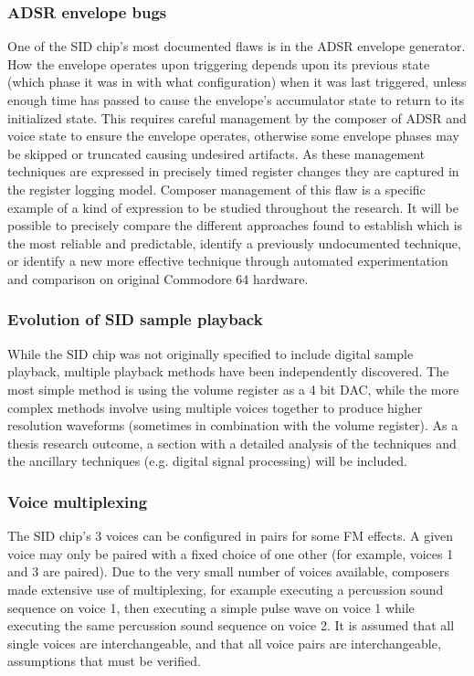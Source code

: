 \documentclass[10pt]{article}
\begin{document}
\begin{multicols*}{2}
\subsubsection{ADSR envelope bugs}

One of the SID chip’s most documented flaws is in the ADSR envelope generator. How the envelope operates upon triggering depends upon its previous state (which phase it was in with what configuration) when it was last triggered, unless enough time has passed to cause the envelope’s accumulator state to return to its initialized state. This requires careful management by the composer of ADSR and voice state to ensure the envelope operates, otherwise some envelope phases may be skipped or truncated causing undesired artifacts. As these management techniques are expressed in precisely timed register changes they are captured in the register logging model. Composer management of this flaw is a specific example of a kind of expression to be studied throughout the research. It will be possible to precisely compare the different approaches found to establish which is the most reliable and predictable, identify a previously undocumented technique, or identify a new more effective technique through automated experimentation and comparison on original Commodore 64 hardware.

\subsubsection{Evolution of SID sample playback}

While the SID chip was not originally specified to include digital sample playback, multiple playback methods have been independently discovered. The most simple method is using the volume register as a 4 bit DAC, while the more complex methods involve using multiple voices together to produce higher resolution waveforms (sometimes in combination with the volume register). As a thesis research outcome, a section with a detailed analysis of the techniques and the ancillary techniques (e.g. digital signal processing) will be included.

\subsubsection{Voice multiplexing}

The SID chip's 3 voices can be configured in pairs for some FM effects. A given voice may only be paired with a fixed choice of one other (for example, voices 1 and 3 are paired). Due to the very small number of voices available, composers made extensive use of multiplexing, for example executing a percussion sound sequence on voice 1, then executing a simple pulse wave on voice 1 while executing the same percussion sound sequence on voice 2. It is assumed that all single voices are interchangeable, and that all voice pairs are interchangeable, assumptions that must be verified.


\end{multicols*}
\end{document}
